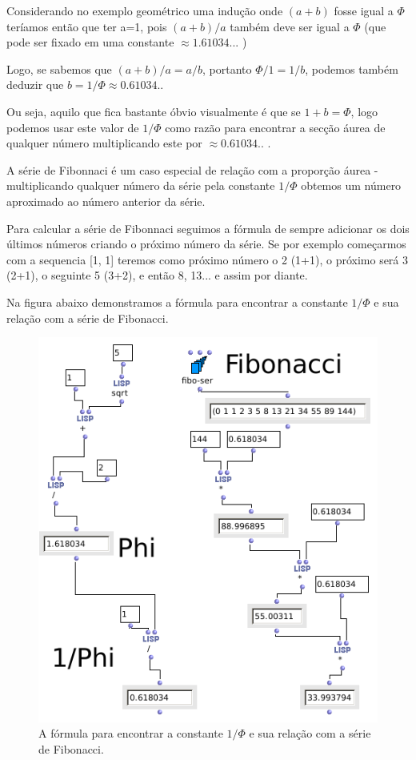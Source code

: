 \documentclass[
	12pt,				%
	openright,			%
	twoside,			%
	a4paper,			%
	english,			%
	french,				%
	spanish,			%
	brazil				%
	]{abntex2}
\begin{document}
Considerando no exemplo geométrico uma indução onde $(a+b)$ fosse igual a $\Phi$ teríamos então que ter a=1, pois $(a+b)/a$ também deve ser igual a $\Phi$ (que pode ser fixado em uma constante  $ \approx 1.61034... $ ) 

Logo, se sabemos que $(a+b)/a = a/b $, portanto $\Phi/1 = 1/b$, podemos também deduzir que $b = 1/\Phi \approx 0.61034.. $ 

Ou seja, aquilo que fica bastante óbvio visualmente é que se $1+b = \Phi$, logo podemos usar este valor de $1/\Phi$ como razão para encontrar a secção áurea de qualquer número multiplicando este por $ \approx 0.61034.. $ .

A série de Fibonnaci é um caso especial de relação com a proporção áurea - multiplicando qualquer número da série pela constante $1/\Phi$ obtemos um número aproximado ao número anterior da série.

Para calcular a série de Fibonnaci seguimos a fórmula de sempre adicionar os dois últimos números criando o próximo número da série. Se por exemplo começarmos com a sequencia [1, 1] teremos como próximo número o 2 (1+1), o próximo será 3 (2+1), o seguinte 5 (3+2), e então 8, 13... e assim por diante. 

Na figura abaixo demonstramos a fórmula para encontrar a constante $1/\Phi$ e sua relação com a série de Fibonacci.

\begin{figure}[!h]
	\caption{\label{fig_grafico}A fórmula para encontrar a constante $1/\Phi$ e sua relação com a série de Fibonacci. }
	\begin{center}
	    \includegraphics[scale=0.5]{OM_settheory/aurea.png}
	\end{center}
\end{figure}	
\end{document}
